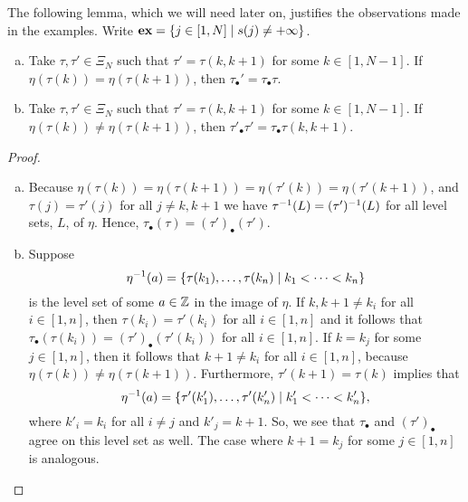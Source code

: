 The following lemma, which we will need later on, justifies the observations made in
the examples. Write $\mathbf{ex} = \{j \in [1, N] \mid s(j) \neq + \infty\}$.

\begin{lemma}\label{lem:tau_bullet}
	\leavevmode
	\begin{enumerate}[(a)]
		\item Take $\tau,\tau' \in \Xi_N$ such that $\tau' = \tau(k, k +1)$ for some $k \in [1,
				      N-1]$. If $\eta(\tau(k)) = \eta(\tau(k+1))$, then $\tau_\bullet' = \tau_\bullet\tau$.
		\item Take $\tau,\tau' \in \Xi_N$ such that $\tau' = \tau(k, k +1)$ for some $k \in [1,
				      N-1]$. If $\eta(\tau(k)) \neq \eta(\tau(k+1))$, then $\tau'_\bullet\tau' =
			      \tau_\bullet\tau (k, k +1)$.
	\end{enumerate}
\end{lemma}
\begin{proof}\leavevmode
	\begin{enumerate}[(a)]
		\item Because $\eta(\tau(k)) = \eta(\tau(k+1)) = \eta(\tau'(k)) = \eta(\tau'(k+1))$, and
		      $\tau(j) = \tau'(j)$ for all $j\neq k, k+1$ we have $\tau^{-1}(L) = (\tau')^{-1}(L)$ for
		      all level sets, $L$, of $\eta$. Hence, $\tau_\bullet(\tau) = (\tau')_\bullet(\tau')$.
		\item Suppose
		      \begin{equation*}
			      \eta^{-1}(a) = \{\tau(k_1), \dots, \tau(k_n) \mid k_1 < \dots < k_n\}
		      \end{equation*}
		      is the level set of some $a\in \mathbb{Z}$ in the image of $\eta$. If $k, k+1 \neq k_i$ for
		      all $i \in [1, n]$, then $\tau(k_i) = \tau'(k_i)$ for all $i\in [1, n]$ and it follows
		      that $\tau_\bullet (\tau(k_i)) = (\tau')_\bullet (\tau'(k_i))$ for all $i\in [1, n]$.
		      If $k = k_j$ for some $j \in [1, n]$, then it follows that $k+1 \neq k_i$ for all $i\in
			      [1, n]$, because $\eta(\tau(k)) \neq \eta(\tau(k+1))$. Furthermore, $\tau'(k+1) =
			      \tau(k)$ implies that
		      \begin{equation*}
			      \eta^{-1}(a) = \{\tau'(k'_1), \dots, \tau'(k'_n)
			      \mid k'_1 < \cdots < k'_n\}	,
		      \end{equation*}
		      where $k'_i = k_i$ for all $i \neq j$ and $k'_j = k+1$. So, we see that $\tau_\bullet$
		      and $(\tau')_\bullet$ agree on this level set as well. The case where $k+1 = k_j$ for
		      some $j\in [1, n]$ is analogous.
	\end{enumerate}
\end{proof}

